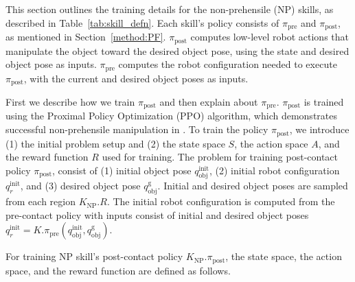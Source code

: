 
\medskip
This section outlines the training details for the non-prehensile (NP) skills, as described in Table~\ref{tab:skill_defn}. Each skill's policy consists of \( \pi_\text{pre} \) and \( \pi_\text{post} \), as mentioned in Section~\ref{method:PF}. \( \pi_\text{post} \) computes low-level robot actions that manipulate the object toward the desired object pose, using the state and desired object pose as inputs. \( \pi_\text{pre} \) computes the robot configuration needed to execute \( \pi_\text{post} \), with the current and desired object poses as inputs.

First we describe how we train \( \pi_\text{post} \) and then explain about \( \pi_\text{pre} \). \( \pi_\text{post} \) is trained using the Proximal Policy Optimization (PPO) algorithm, which demonstrates successful non-prehensile manipulation in \citet{kim2023pre}. To train the policy \( \pi_\text{post} \), we introduce (1) the initial problem setup and (2) the state space $S$, the action space $A$, and the reward function $R$ used for training. The problem for training post-contact policy \( \pi_\text{post} \), consist of (1) initial object pose $q^\text{init}_\text{obj}$, (2) initial robot configuration $q^\text{init}_r$, and (3) desired object pose $q^\text{g}_\text{obj}$. Initial and desired object poses are sampled from each region $K_\text{NP}.R$. The initial robot configuration is computed from the pre-contact policy with inputs consist of initial and desired object poses $q^\text{init}_r = K.\pi_\text{pre}(q^\text{init}_\text{obj}, q^\text{g}_\text{obj})$.

For training NP skill's post-contact policy $K_\text{NP}.\pi_\text{post}$, the state space, the action space, and the reward function are defined as follows. 

